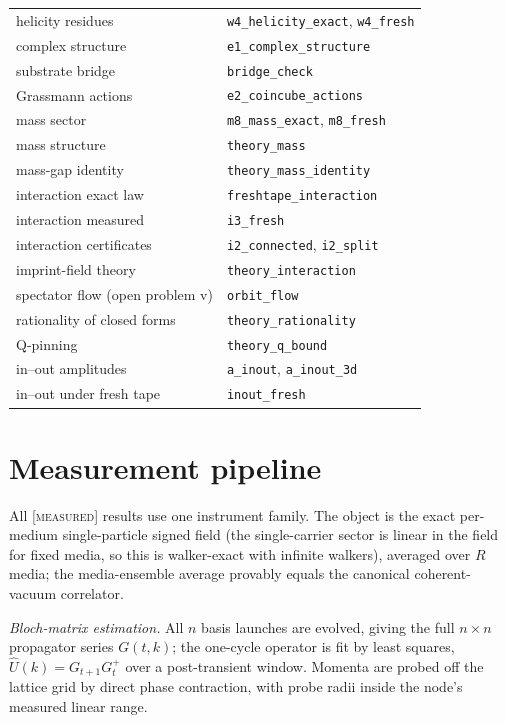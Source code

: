 \documentclass[aps,prd,twocolumn,superscriptaddress,nofootinbib,floatfix]{revtex4-2}
\newcommand{\evX}{\textnormal{\textsc{[measured]}}}
\begin{document}
\begin{table}[!htb]
\begin{ruledtabular}
\begin{tabular}{ll}
helicity residues & \texttt{w4\_helicity\_exact}, \texttt{w4\_fresh}\\
complex structure & \texttt{e1\_complex\_structure}\\
substrate bridge & \texttt{bridge\_check}\\
Grassmann actions & \texttt{e2\_coincube\_actions}\\
mass sector & \texttt{m8\_mass\_exact}, \texttt{m8\_fresh}\\
mass structure & \texttt{theory\_mass}\\
mass-gap identity & \texttt{theory\_mass\_identity}\\
interaction exact law & \texttt{freshtape\_interaction}\\
interaction measured & \texttt{i3\_fresh}\\
interaction certificates & \texttt{i2\_connected}, \texttt{i2\_split}\\
imprint-field theory & \texttt{theory\_interaction}\\
spectator flow (open problem v) & \texttt{orbit\_flow}\\
rationality of closed forms & \texttt{theory\_rationality}\\
Q-pinning & \texttt{theory\_q\_bound}\\
in--out amplitudes & \texttt{a\_inout}, \texttt{a\_inout\_3d}\\
in--out under fresh tape & \texttt{inout\_fresh}
\end{tabular}
\end{ruledtabular}
\end{table}

\section{Measurement pipeline}
\label{app:instrument}

All \evX{} results use one instrument family. The object is the exact
per-medium single-particle signed field (the single-carrier sector is
linear in the field for fixed media, so this is walker-exact with infinite
walkers), averaged over $R$ media; the media-ensemble average provably
equals the canonical coherent-vacuum correlator.

\emph{Bloch-matrix estimation.} All $n$ basis launches are evolved, giving
the full $n\times n$ propagator series $G(t,k)$; the one-cycle operator is
fit by least squares, $\hat U(k)=G_{t+1}G_t^+$ over a post-transient
window. Momenta are probed off the lattice grid by direct phase
contraction, with probe radii inside the node's measured linear range.
\end{document}
